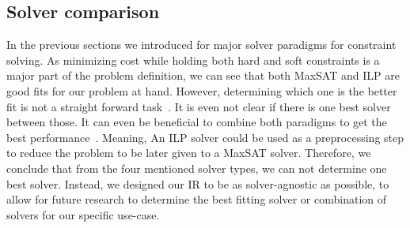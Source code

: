\subsection{Solver comparison}
In the previous sections we introduced for major solver paradigms for constraint solving. As minimizing cost while holding both hard and soft constraints is a major part of the problem definition, we can see that both \ac{MaxSAT} and \ac{ILP} are good fits for our problem at hand. However, determining which one is the better fit is not a straight forward task~\cite{bib:2013-ansotegui}. It is even not clear if there is one best solver between those. It can even be beneficial to combine both paradigms to get the best performance~\cite{bib:2025-zhang}. Meaning, An \ac{ILP} solver could be used as a preprocessing step to reduce the problem to be later given to a \ac{MaxSAT} solver. Therefore, we conclude that from the four mentioned solver types, we can not determine one best solver. Instead, we designed our \Ac{IR} to be as solver-agnostic as possible, to allow for future research to determine the best fitting solver or combination of solvers for our specific use-case.

